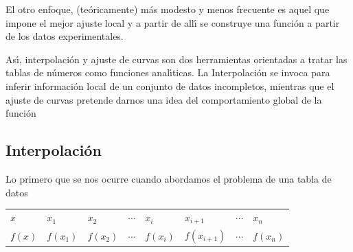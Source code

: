 \documentclass[spanish,titlepage,11pt]{article}
\begin{document}
El otro enfoque, (te\'{o}ricamente) m\'{a}s modesto y menos frecuente es aquel
que impone el mejor ajuste local y a partir de all\'{\i} se construye una
funci\'{o}n a partir de los datos experimentales.

As\'{\i}, interpolaci\'{o}n y ajuste de curvas son dos herramientas orientadas
a tratar las tablas de n\'{u}meros como funciones anal\'{\i}ticas. La
Interpolaci\'{o}n se invoca para inferir informaci\'{o}n local de un conjunto
de datos incompletos, mientras que el ajuste de curvas pretende darnos una
idea del comportamiento global de la funci\'{o}n

\subsection{Interpolaci\'{o}n}

Lo primero que se nos ocurre cuando abordamos el problema de una tabla de datos

\begin{center}%
\begin{tabular}
[c]{llllllll}%
$x$ & $x_{1}$ & $x_{2}$ & $\cdots$ & $x_{i}$ & $x_{i+1}$ & $\cdots$ & $x_{n}%
$\\
$f\left(  x\right)  $ & $f\left(  x_{1}\right)  $ & $f\left(  x_{2}\right)  $%
& $\cdots$ & $f\left(  x_{i}\right)  $ & $f\left(  x_{i+1}\right)  $ &
$\cdots$ & $f\left(  x_{n}\right)  $%
\end{tabular}
\end{center}
\end{document}
